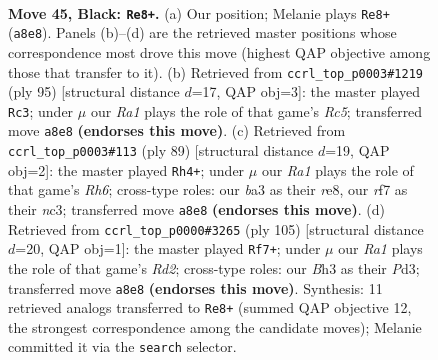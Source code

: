 \documentclass[11pt]{article}
\begin{document}
\clearpage

\begin{figure}[p]\centering
\begin{subfigure}{0.46\textwidth}\centering
\resizebox{\linewidth}{!}{%
\newchessgame
\chessboard[
  setfen={r6k/5R2/p1p5/8/8/B6b/8/1N2K3 b - - 2 45},
  showmover=false,
  pgfstyle=straightmove, color=movearrow, markmove={a8-e8}
]}
\caption{}
\end{subfigure}\hfill
\begin{subfigure}{0.46\textwidth}\centering
\resizebox{\linewidth}{!}{%
\newchessgame
\chessboard[
  setfen={2k5/R7/6p1/8/2r1b3/6B1/4K2P/8 b - - 1 48},
  showmover=false,
  pgfstyle=straightmove, color=movearrow, markmove={c4-c3}
]}
\caption{}
\end{subfigure}
\\[4pt]
\begin{subfigure}{0.46\textwidth}\centering
\resizebox{\linewidth}{!}{%
\newchessgame
\chessboard[
  setfen={4R3/8/6pk/8/1P1K4/2N2b1r/8/8 b - - 1 45},
  showmover=false,
  pgfstyle=straightmove, color=movearrow, markmove={h3-h4}
]}
\caption{}
\end{subfigure}\hfill
\begin{subfigure}{0.46\textwidth}\centering
\resizebox{\linewidth}{!}{%
\newchessgame
\chessboard[
  setfen={8/3r3k/8/5K2/8/3p2P1/8/2R5 b - - 3 53},
  showmover=false,
  pgfstyle=straightmove, color=movearrow, markmove={d7-f7}
]}
\caption{}
\end{subfigure}
\caption{\textbf{Move 45, Black: \texttt{Re8+}.} (a) Our position; Melanie plays \texttt{Re8+} (\texttt{a8e8}). Panels (b)--(d) are the retrieved master positions whose correspondence most drove this move (highest QAP objective among those that transfer to it). (b) Retrieved from \texttt{ccrl\_top\_p0003\#1219} (ply 95) [structural distance $d$=17, QAP obj=3]: the master played \texttt{Rc3}; under $\mu$ our \emph{Ra1} plays the role of that game's \emph{Rc5}; transferred move \texttt{a8e8} \textbf{(endorses this move)}. (c) Retrieved from \texttt{ccrl\_top\_p0003\#113} (ply 89) [structural distance $d$=19, QAP obj=2]: the master played \texttt{Rh4+}; under $\mu$ our \emph{Ra1} plays the role of that game's \emph{Rh6}; cross-type roles: our \emph{b}a3 as their \emph{r}e8, our \emph{r}f7 as their \emph{n}c3; transferred move \texttt{a8e8} \textbf{(endorses this move)}. (d) Retrieved from \texttt{ccrl\_top\_p0000\#3265} (ply 105) [structural distance $d$=20, QAP obj=1]: the master played \texttt{Rf7+}; under $\mu$ our \emph{Ra1} plays the role of that game's \emph{Rd2}; cross-type roles: our \emph{B}h3 as their \emph{P}d3; transferred move \texttt{a8e8} \textbf{(endorses this move)}. Synthesis: 11 retrieved analogs transferred to \texttt{Re8+} (summed QAP objective 12, the strongest correspondence among the candidate moves); Melanie committed it via the \texttt{search} selector.}
\label{fig:thought-m89}
\end{figure}
\end{document}
